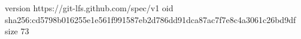 version https://git-lfs.github.com/spec/v1
oid sha256:cd5798b016255e1e561f991587eb2d786dd91dca87ac7f7e8c4a3061c26bd9df
size 73
